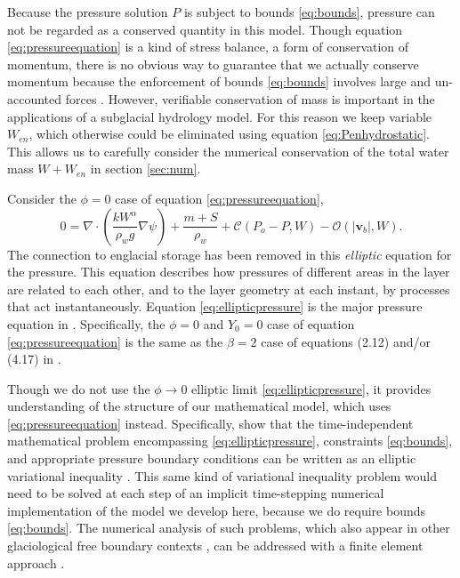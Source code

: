 \documentclass[11pt,final]{amsart}
\newcommand\bv{\mathbf{v}}
\newcommand{\Div}{\nabla\cdot}
\newcommand{\grad}{\nabla}
\begin{document}
Because the pressure solution $P$ is subject to bounds \eqref{eq:bounds}, pressure can not be regarded as a conserved quantity in this model.  Though equation \eqref{eq:pressureequation} is a kind of stress balance, a form of conservation of momentum, there is no obvious way to guarantee that we actually conserve momentum because the enforcement of bounds \eqref{eq:bounds} involves large and un-accounted forces \citep{Schoofetal2012}.  However, verifiable conservation of mass is important in the applications of a subglacial hydrology model.  For this reason we keep variable $W_{en}$, which otherwise could be eliminated using equation \eqref{eq:Penhydrostatic}.  This allows us to carefully consider the numerical conservation of the total water mass $W+W_{en}$ in section \ref{sec:num}.

Consider the $\phi=0$ case of equation \eqref{eq:pressureequation},
\begin{equation}
0 = \Div\left(\frac{k W^\alpha}{\rho_w g} \grad \psi\right) + \frac{m+S}{\rho_w} + \mathcal{C}(P_o-P,W) - \mathcal{O}(|\bv_b|,W). \label{eq:ellipticpressure}
\end{equation}
The connection to englacial storage has been removed in this \emph{elliptic} equation for the pressure.  This equation describes how pressures of different areas in the layer are related to each other, and to the layer geometry at each instant, by processes that act instantaneously.  Equation \eqref{eq:ellipticpressure} is the major pressure equation in \citep{Schoofetal2012}.  Specifically, the $\phi=0$ and $Y_0=0$ case of equation \eqref{eq:pressureequation} is the same as the $\beta=2$ case of equations (2.12) and/or (4.17) in \citep{Schoofetal2012}.

Though we do not use the $\phi\to 0$ elliptic limit \eqref{eq:ellipticpressure}, it provides understanding of the structure of our mathematical model, which uses \eqref{eq:pressureequation} instead.  Specifically, \cite{Schoofetal2012} show that the time-independent mathematical problem encompassing \eqref{eq:ellipticpressure}, constraints \eqref{eq:bounds}, and appropriate pressure boundary conditions can be written as an elliptic variational inequality \citep{KinderlehrerStampacchia}.  This same kind of variational inequality problem would need to be solved at each step of an implicit time-stepping numerical implementation of the model we develop here, because we do require bounds \eqref{eq:bounds}.  The numerical analysis of such problems, which also appear in other glaciological free boundary contexts \citep{SchoofStream,JouvetBueler2012}, can be addressed with a finite element approach \citep{Ciarlet}.
\end{document}

